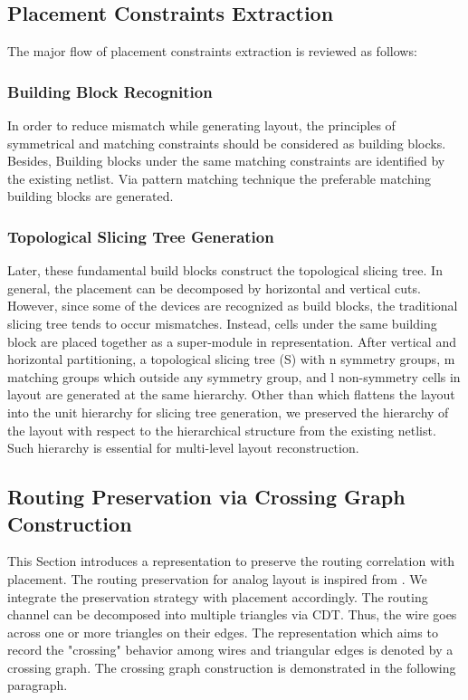     \subsection{Placement Constraints Extraction}\label{sec:PlExtract}



      The major flow of placement constraints extraction \cite{ALP_YPWeng_iccad2011} is reviewed as follows:
      \subsubsection{Building Block Recognition}
        In order to reduce mismatch while generating layout, the principles of symmetrical and matching constraints should be considered as building blocks. 
        Besides, Building blocks under the same matching constraints are identified by the existing netlist. Via pattern matching technique \cite{srm-massier-tcad08} the preferable matching building blocks are generated.

      \subsubsection{Topological Slicing Tree Generation}
        Later, these fundamental build blocks construct the topological slicing tree. In general, the placement can be decomposed by horizontal and vertical cuts. However, since some of the devices are recognized as build blocks, the traditional slicing tree tends to occur mismatches. Instead, cells under the same building block are placed together as a super-module in representation. After vertical and horizontal  partitioning, a topological slicing tree (S) with n symmetry groups, m matching groups which outside any symmetry group, and l non-symmetry cells in layout are generated at the same hierarchy. Other than \cite{ALP_YPWeng_iccad2011} which flattens the layout into the unit hierarchy for slicing tree generation, we preserved the hierarchy of the layout with respect to the hierarchical structure from the existing netlist. Such hierarchy is essential for multi-level layout reconstruction. 
    \subsection{Routing Preservation via Crossing Graph Construction}\label{sec:CGC}

      This Section introduces a representation to preserve the routing correlation with placement. The routing preservation for analog layout is inspired from \cite{Chin_DMR_ICCAD2013}. We integrate the preservation strategy with placement accordingly. The routing channel can be decomposed into multiple triangles via CDT. Thus, the wire goes across one or more triangles on their edges. The representation which aims to record the "crossing" behavior among wires and triangular edges is denoted by a crossing graph. The crossing graph construction is demonstrated in the following paragraph. 

